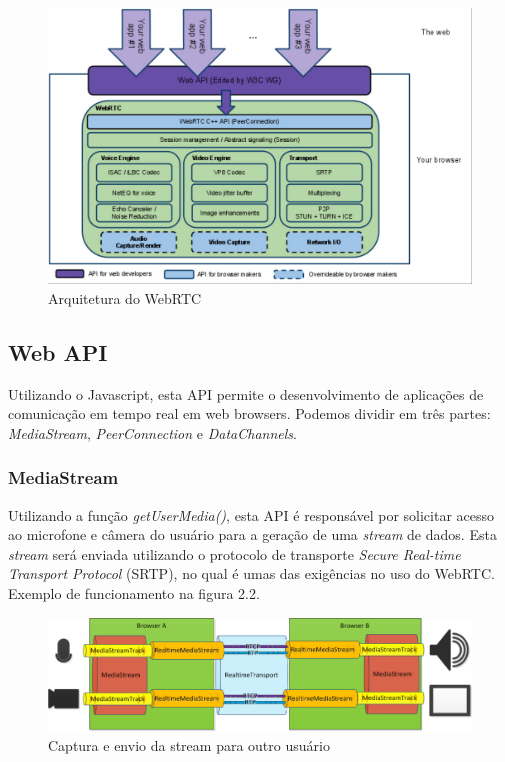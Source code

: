 \documentclass[ruledheader]{abnt} %
\begin{document}
\begin{figure}[!htdb]
 \centering
  \includegraphics[width = 1.2\linewidth]{images/webrtcArchitecture}
  \caption{Arquitetura do WebRTC} %
  \label{f_webrtcArquitetura}
\end{figure}

\subsection{Web API}
\label{ss_webApi}
Utilizando o Javascript, esta API permite o desenvolvimento de aplicações de comunicação em tempo real em web browsers. Podemos dividir em três partes: \textit{MediaStream}, \textit{PeerConnection} e \textit{DataChannels}.

\subsubsection{MediaStream}
\label{sss_mediaStream}
Utilizando a função \textit{getUserMedia()}, esta API é responsável por solicitar acesso ao microfone e câmera do usuário para a geração de uma \textit{stream} de dados. Esta \textit{stream} será enviada utilizando o protocolo de transporte \textit{Secure Real-time Transport Protocol} (SRTP), no qual é umas das exigências no uso do WebRTC. Exemplo de funcionamento na figura 2.2.

\begin{figure}[!htdb]
 \centering
  \includegraphics[width = 1.1\linewidth]{images/mediaStream}
  \caption{Captura e envio da stream para outro usuário} %
  \label{f_mediaStream}
\end{figure}
\end{document}
